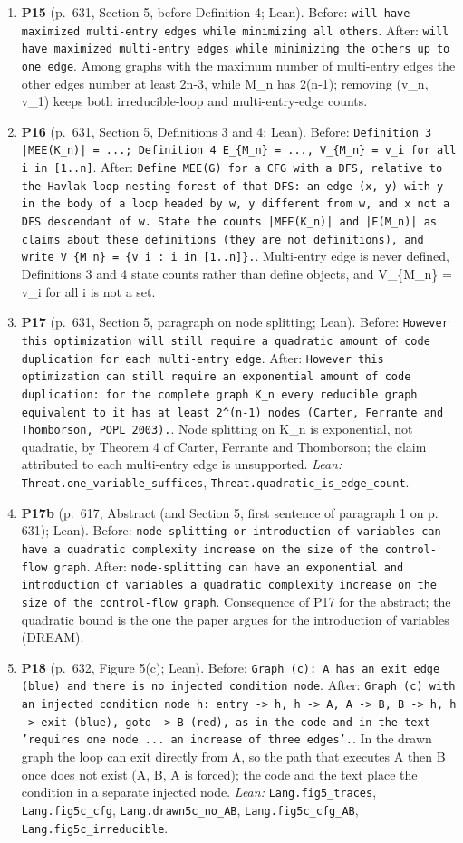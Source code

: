 \documentclass[9pt,twocolumn]{article}
\begin{document}
\begin{enumerate}[label=]
\item \textbf{P15} (p.~631, Section 5, before Definition 4; Lean). Before: \texttt{will have maximized multi-entry edges while minimizing all others}. After: \texttt{will have maximized multi-entry edges while minimizing the others up to one edge}. Among graphs with the maximum number of multi-entry edges the other edges number at least 2n-3, while M\_n has 2(n-1); removing (v\_n, v\_1) keeps both irreducible-loop and multi-entry-edge counts. 
\item \textbf{P16} (p.~631, Section 5, Definitions 3 and 4; Lean). Before: \texttt{Definition 3 |MEE(K\_n)| = ...; Definition 4 E\_\{M\_n\} = ..., V\_\{M\_n\} = v\_i for all i in [1..n]}. After: \texttt{Define MEE(G) for a CFG with a DFS, relative to the Havlak loop nesting forest of that DFS: an edge (x, y) with y in the body of a loop headed by w, y different from w, and x not a DFS descendant of w. State the counts |MEE(K\_n)| and |E(M\_n)| as claims about these definitions (they are not definitions), and write V\_\{M\_n\} = \{v\_i : i in [1..n]\}.}. Multi-entry edge is never defined, Definitions 3 and 4 state counts rather than define objects, and V\_\{M\_n\} = v\_i for all i is not a set. 
\item \textbf{P17} (p.~631, Section 5, paragraph on node splitting; Lean). Before: \texttt{However this optimization will still require a quadratic amount of code duplication for each multi-entry edge}. After: \texttt{However this optimization can still require an exponential amount of code duplication: for the complete graph K\_n every reducible graph equivalent to it has at least 2\^{}(n-1) nodes (Carter, Ferrante and Thomborson, POPL 2003).}. Node splitting on K\_n is exponential, not quadratic, by Theorem 4 of Carter, Ferrante and Thomborson; the claim attributed to each multi-entry edge is unsupported. \emph{Lean:} \texttt{Threat.one\_variable\_suffices}, \texttt{Threat.quadratic\_is\_edge\_count}. 
\item \textbf{P17b} (p.~617, Abstract (and Section 5, first sentence of paragraph 1 on p. 631); Lean). Before: \texttt{node-splitting or introduction of variables can have a quadratic complexity increase on the size of the control-flow graph}. After: \texttt{node-splitting can have an exponential and introduction of variables a quadratic complexity increase on the size of the control-flow graph}. Consequence of P17 for the abstract; the quadratic bound is the one the paper argues for the introduction of variables (DREAM). 
\item \textbf{P18} (p.~632, Figure 5(c); Lean). Before: \texttt{Graph (c): A has an exit edge (blue) and there is no injected condition node}. After: \texttt{Graph (c) with an injected condition node h: entry -> h, h -> A, A -> B, B -> h, h -> exit (blue), goto -> B (red), as in the code and in the text 'requires one node ... an increase of three edges'.}. In the drawn graph the loop can exit directly from A, so the path that executes A then B once does not exist (A, B, A is forced); the code and the text place the condition in a separate injected node. \emph{Lean:} \texttt{Lang.fig5\_traces}, \texttt{Lang.fig5c\_cfg}, \texttt{Lang.drawn5c\_no\_AB}, \texttt{Lang.fig5c\_cfg\_AB}, \texttt{Lang.fig5c\_irreducible}. 

\end{enumerate}
\end{document}
